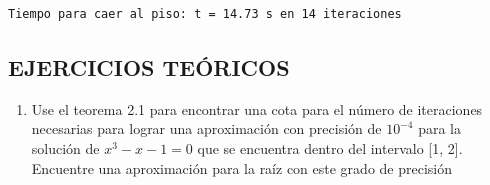 \documentclass[
  english,
  letterpaper,
  DIV=11,
  numbers=noendperiod]{scrartcl}
\providecommand{\tightlist}{%
  \setlength{\itemsep}{0pt}\setlength{\parskip}{0pt}}
\begin{document}
\begin{verbatim}
Tiempo para caer al piso: t = 14.73 s en 14 iteraciones
\end{verbatim}

\subsection{EJERCICIOS TEÓRICOS}\label{ejercicios-teuxf3ricos}

\begin{enumerate}
\def\labelenumi{\arabic{enumi}.}
\tightlist
\item
  Use el teorema 2.1 para encontrar una cota para el número de
  iteraciones necesarias para lograr una aproximación con precisión de
  \(10^{-4}\) para la solución de \(x^{3}-x-1=0\) que se encuentra
  dentro del intervalo {[}1, 2{]}. Encuentre una aproximación para la
  raíz con este grado de precisión
\end{enumerate}
\end{document}
